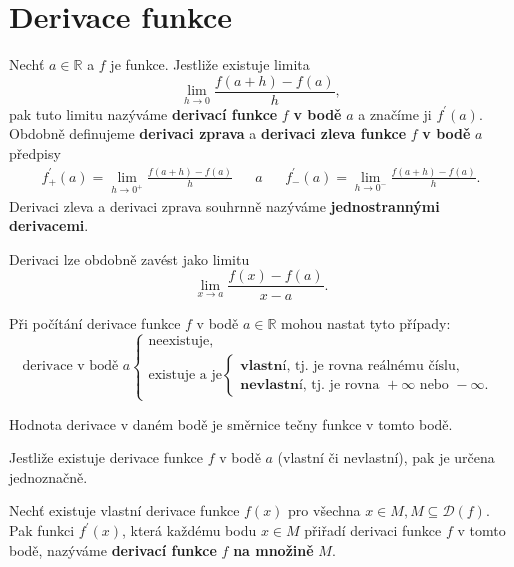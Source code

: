 \section{Derivace funkce}
\begin{definition}\label{derivace}
Nechť $a \in \mathbb R$ a $f$ je funkce. Jestliže existuje limita
$$\lim_{h\to 0} \frac{f(a+h)-f(a)}{h},$$
pak tuto limitu nazýváme \textbf{derivací funkce} $f$ \textbf{v bodě} $a$ a značíme ji $f^\prime (a).$
Obdobně definujeme \textbf{derivaci zprava} a \textbf{derivaci zleva funkce} $f$ \textbf{v bodě}
$a$ předpisy
\begin{align*}
    f_+^\prime(a) = \lim_{h\to 0^+} \frac{f(a+h)-f(a)}{h} & & a & & f_-^\prime(a) = \lim_{h\to 0^-} \frac{f(a+h)-f(a)}{h}.
\end{align*}
Derivaci zleva a derivaci zprava souhrnně nazýváme \textbf{jednostrannými derivacemi}.
\end{definition}

\begin{pozn}
    Derivaci lze obdobně zavést jako limitu
    $$\lim_{x\to a} \frac{f(x)-f(a)}{x-a}.$$
\end{pozn}

\begin{pozn}
     Při počítání derivace funkce $f$ v bodě $a\in \mathbb R$ mohou nastat
     tyto případy:
     $$
     \textrm{derivace v bodě } a \begin{cases}
        \textrm{neexistuje,} \\
        \textrm{existuje a je} \begin{cases}
            \textbf{vlastní}\textrm{, tj. je rovna reálnému číslu}, \\
            \textbf{nevlastní}\textrm{, tj. je rovna } +\infty \textrm{ nebo } - \infty.
        \end{cases}
     \end{cases}
     $$
\end{pozn}

\begin{pozn}
    Hodnota derivace v daném bodě je směrnice tečny funkce v tomto bodě.
\end{pozn}

\begin{veta}
    Jestliže existuje derivace funkce $f$ v bodě $a$ (vlastní či nevlastní),
    pak je určena jednoznačně.
\end{veta}

\begin{definition}
Nechť existuje vlastní derivace funkce $f(x)$ pro všechna $x\in M, M\subseteq \mathcal D(f).$
Pak funkci $f^\prime(x)$, která každému bodu $x\in M$ přiřadí derivaci funkce $f$
v tomto bodě, nazýváme \textbf{derivací funkce} $f$ \textbf{na množině} $M.$
\end{definition}

